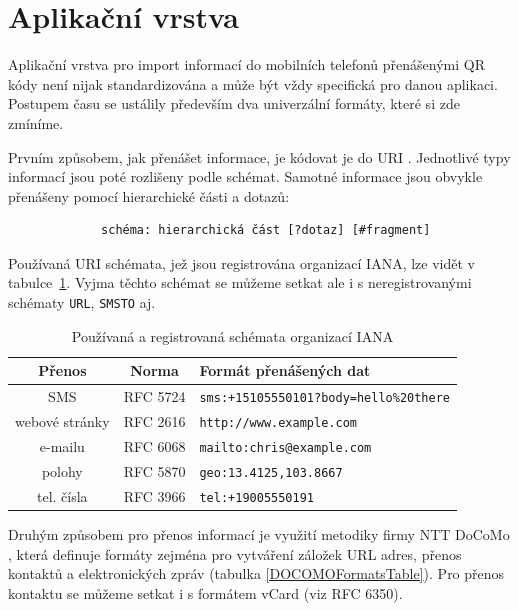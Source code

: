 \section{Aplikační vrstva}
\label{aplikacniVrstva}

Aplikační vrstva pro import informací do mobilních telefonů přenášenými QR kódy 
není nijak standardizována a může být vždy specifická pro danou aplikaci. 
Postupem času se ustálily především dva univerzální formáty, které si zde 
zmíníme.

Prvním způsobem, jak přenášet informace, je kódovat je do URI
\cite{zxingContents,sixrevisionsURI}. Jednotlivé typy informací jsou poté
rozlišeny podle schémat. Samotné informace jsou obvykle přenášeny pomocí
hierarchické části a dotazů:

\begin{verbatim}
             schéma: hierarchická část [?dotaz] [#fragment]
\end{verbatim}

Používaná URI schémata, jež jsou registrována organizací IANA, lze vidět v
tabulce~\ref{URISChemes}. Vyjma těchto schémat se můžeme setkat ale i s
neregistrovanými schématy \texttt{URL}, \texttt{SMSTO} aj.

\begin{table}[H]
  \begin{center} 
    \begin{tabular}{| c | c | l |} \hline
    \textbf{Přenos} & \textbf{Norma} & \textbf{Formát přenášených dat} \\ \hline
    SMS & RFC 5724 & \texttt{sms:+15105550101?body=hello\%20there} \\ \hline
    webové stránky & RFC 2616 & \texttt{http://www.example.com} \\ \hline
    e-mailu & RFC 6068 & \texttt{mailto:chris@example.com} \\ \hline
    polohy & RFC 5870 & \texttt{geo:13.4125,103.8667} \\ \hline
    tel. čísla & RFC 3966 & \texttt{tel:+19005550191} \\ \hline
    \end{tabular}
    \caption{Používaná a registrovaná schémata organizací IANA}
    \label{URISChemes}
  \end{center}
\end{table}

Druhým způsobem pro přenos informací je využití metodiky firmy NTT DoCoMo
\cite{DOCOMOFormatsLiterature}, která definuje formáty zejména pro vytváření
záložek URL adres, přenos kontaktů a elektronických zpráv (tabulka
\ref{DOCOMOFormatsTable}). Pro přenos kontaktu se můžeme setkat i s formátem
vCard (viz RFC 6350).

